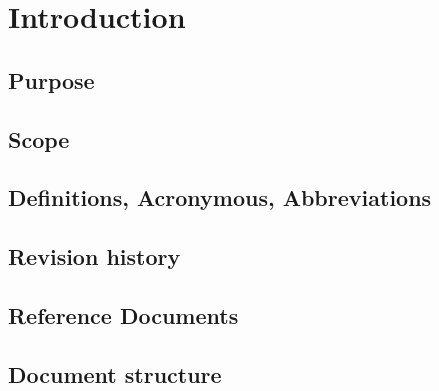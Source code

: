 \chapter{Introduction}

\section{Purpose}
\section{Scope}
\section{Definitions, Acronymous, Abbreviations}
\section{Revision history}
\section{Reference Documents}
\section{Document structure}
